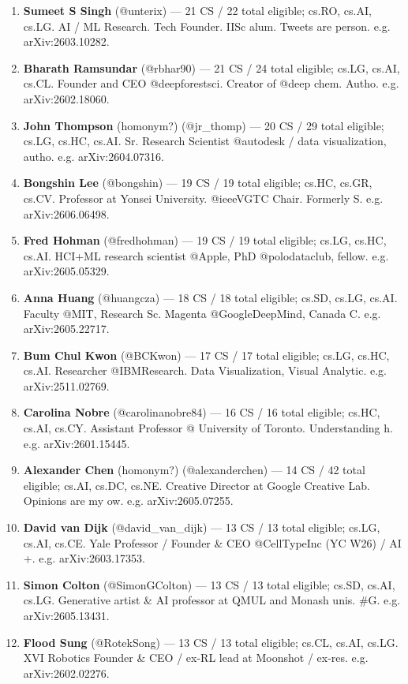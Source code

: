 \documentclass[twocolumn,10pt,letterpaper]{article}
\begin{document}
\begin{enumerate}
  \item \textbf{Sumeet S Singh} (@unterix) — 21 CS / 22 total eligible; cs.RO, cs.AI, cs.LG. AI / ML Research. Tech Founder. IISc alum. Tweets are person. e.g. arXiv:2603.10282.
  \item \textbf{Bharath Ramsundar} (@rbhar90) — 21 CS / 24 total eligible; cs.LG, cs.AI, cs.CL. Founder and CEO @deepforestsci. Creator of @deep chem. Autho. e.g. arXiv:2602.18060.
  \item \textbf{John Thompson} (homonym?) (@jr\_thomp) — 20 CS / 29 total eligible; cs.LG, cs.HC, cs.AI. Sr. Research Scientist @autodesk / data visualization, autho. e.g. arXiv:2604.07316.
  \item \textbf{Bongshin Lee} (@bongshin) — 19 CS / 19 total eligible; cs.HC, cs.GR, cs.CV. Professor at Yonsei University. @ieeeVGTC Chair. Formerly  S. e.g. arXiv:2606.06498.
  \item \textbf{Fred Hohman} (@fredhohman) — 19 CS / 19 total eligible; cs.LG, cs.HC, cs.AI. HCI+ML research scientist @Apple, PhD @polodataclub, fellow. e.g. arXiv:2605.05329.
  \item \textbf{Anna Huang} (@huangcza) — 18 CS / 18 total eligible; cs.SD, cs.LG, cs.AI. Faculty @MIT, Research Sc. Magenta @GoogleDeepMind, Canada C. e.g. arXiv:2605.22717.
  \item \textbf{Bum Chul Kwon} (@BCKwon) — 17 CS / 17 total eligible; cs.LG, cs.HC, cs.AI. Researcher @IBMResearch. Data Visualization, Visual Analytic. e.g. arXiv:2511.02769.
  \item \textbf{Carolina Nobre} (@carolinanobre84) — 16 CS / 16 total eligible; cs.HC, cs.AI, cs.CY. Assistant Professor @ University of Toronto. Understanding h. e.g. arXiv:2601.15445.
  \item \textbf{Alexander Chen} (homonym?) (@alexanderchen) — 14 CS / 42 total eligible; cs.AI, cs.DC, cs.NE. Creative Director at Google Creative Lab. Opinions are my ow. e.g. arXiv:2605.07255.
  \item \textbf{David van Dijk} (@david\_van\_dijk) — 13 CS / 13 total eligible; cs.LG, cs.AI, cs.CE. Yale Professor / Founder \& CEO @CellTypeInc (YC W26) / AI +. e.g. arXiv:2603.17353.
  \item \textbf{Simon Colton} (@SimonGColton) — 13 CS / 13 total eligible; cs.SD, cs.AI, cs.LG. Generative artist \& AI professor at QMUL and Monash unis. \#G. e.g. arXiv:2605.13431.
  \item \textbf{Flood Sung} (@RotekSong) — 13 CS / 13 total eligible; cs.CL, cs.AI, cs.LG. XVI Robotics Founder \& CEO / ex-RL lead at Moonshot / ex-res. e.g. arXiv:2602.02276.

\end{enumerate}
\end{document}
